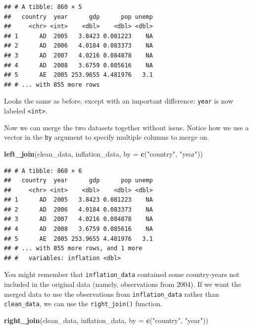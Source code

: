 \documentclass[12pt,oneside,openany]{tufte-book}
\newenvironment{Shaded}{}{}
\newcommand{\KeywordTok}[1]{\textcolor[rgb]{0.00,0.44,0.13}{\textbf{{#1}}}}
\newcommand{\DataTypeTok}[1]{\textcolor[rgb]{0.56,0.13,0.00}{{#1}}}
\newcommand{\StringTok}[1]{\textcolor[rgb]{0.25,0.44,0.63}{{#1}}}
\newcommand{\NormalTok}[1]{{#1}}
\begin{document}
\begin{verbatim}
## # A tibble: 860 × 5
##   country  year      gdp      pop unemp
##     <chr> <int>    <dbl>    <dbl> <dbl>
## 1      AD  2005   3.8423 0.081223    NA
## 2      AD  2006   4.0184 0.083373    NA
## 3      AD  2007   4.0216 0.084878    NA
## 4      AD  2008   3.6759 0.085616    NA
## 5      AE  2005 253.9655 4.481976   3.1
## # ... with 855 more rows
\end{verbatim}

Looks the same as before, except with an important difference:
\texttt{year} is now labeled \texttt{\textless{}int\textgreater{}}.

Now we can merge the two datasets together without issue. Notice how we
use a vector in the \texttt{by} argument to specify multiple columns to
merge on.

\begin{Shaded}
\begin{Highlighting}[]
\KeywordTok{left_join}\NormalTok{(clean_data, inflation_data, }\DataTypeTok{by =} \KeywordTok{c}\NormalTok{(}\StringTok{"country"}\NormalTok{, }
    \StringTok{"year"}\NormalTok{))}
\end{Highlighting}
\end{Shaded}

\begin{verbatim}
## # A tibble: 860 × 6
##   country  year      gdp      pop unemp
##     <chr> <int>    <dbl>    <dbl> <dbl>
## 1      AD  2005   3.8423 0.081223    NA
## 2      AD  2006   4.0184 0.083373    NA
## 3      AD  2007   4.0216 0.084878    NA
## 4      AD  2008   3.6759 0.085616    NA
## 5      AE  2005 253.9655 4.481976   3.1
## # ... with 855 more rows, and 1 more
## #   variables: inflation <dbl>
\end{verbatim}

You might remember that \texttt{inflation\_data} contained some
country-years not included in the original data (namely, observations
from 2004). If we want the merged data to use the observations from
\texttt{inflation\_data} rather than \texttt{clean\_data}, we can use
the \texttt{right\_join()} function.

\begin{Shaded}
\begin{Highlighting}[]
\KeywordTok{right_join}\NormalTok{(clean_data, inflation_data, }\DataTypeTok{by =} \KeywordTok{c}\NormalTok{(}\StringTok{"country"}\NormalTok{, }
    \StringTok{"year"}\NormalTok{))}
\end{Highlighting}
\end{Shaded}
\end{document}
